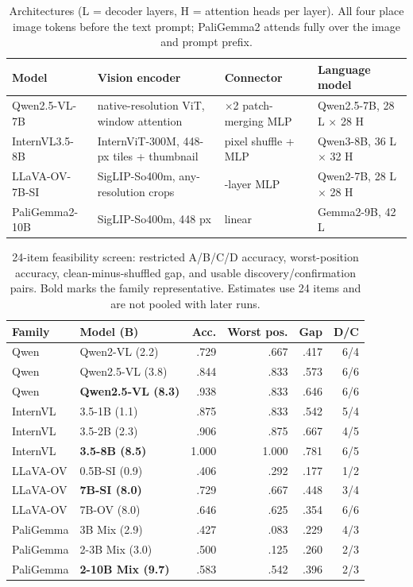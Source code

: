 \documentclass[11pt]{article}
\begin{document}
\begin{table}[h]
\centering
\scriptsize
\setlength{\tabcolsep}{2pt}
\begin{tabularx}{\columnwidth}{@{}l>{\raggedright\arraybackslash}X>{\raggedright\arraybackslash}X>{\raggedright\arraybackslash}p{}@{}}
\toprule
Model & Vision encoder & Connector & Language model \\
\midrule
Qwen2.5-VL-7B & native-resolution ViT, window attention & 2$\times$2 patch-merging MLP & Qwen2.5-7B, 28 L $\times$ 28 H \\
InternVL3.5-8B & InternViT-300M, 448-px tiles + thumbnail & pixel shuffle + MLP & Qwen3-8B, 36 L $\times$ 32 H \\
LLaVA-OV-7B-SI & SigLIP-So400m, any-resolution crops & 2-layer MLP & Qwen2-7B, 28 L $\times$ 28 H \\
PaliGemma2-10B & SigLIP-So400m, 448 px & linear & Gemma2-9B, 42 L \\
\bottomrule
\end{tabularx}
\caption{Architectures (L = decoder layers, H = attention heads per layer). All four place image tokens before the text prompt; PaliGemma2 attends fully over the image and prompt prefix.}
\label{tab:arch}
\end{table}

\begin{table}[h]
\centering
\scriptsize
\setlength{\tabcolsep}{2.5pt}
\begin{tabular}{@{}llrrrr@{}}
\toprule
Family & Model (B) & Acc. & Worst pos. & Gap & D/C \\
\midrule
Qwen & Qwen2-VL (2.2) & .729 & .667 & .417 & 6/4 \\
Qwen & Qwen2.5-VL (3.8) & .844 & .833 & .573 & 6/6 \\
Qwen & \textbf{Qwen2.5-VL (8.3)} & .938 & .833 & .646 & 6/6 \\
InternVL & 3.5-1B (1.1) & .875 & .833 & .542 & 5/4 \\
InternVL & 3.5-2B (2.3) & .906 & .875 & .667 & 4/5 \\
InternVL & \textbf{3.5-8B (8.5)} & 1.000 & 1.000 & .781 & 6/5 \\
LLaVA-OV & 0.5B-SI (0.9) & .406 & .292 & .177 & 1/2 \\
LLaVA-OV & \textbf{7B-SI (8.0)} & .729 & .667 & .448 & 3/4 \\
LLaVA-OV & 7B-OV (8.0) & .646 & .625 & .354 & 6/6 \\
PaliGemma & 3B Mix (2.9) & .427 & .083 & .229 & 4/3 \\
PaliGemma & 2-3B Mix (3.0) & .500 & .125 & .260 & 2/3 \\
PaliGemma & \textbf{2-10B Mix (9.7)} & .583 & .542 & .396 & 2/3 \\
\bottomrule
\end{tabular}
\caption{24-item feasibility screen: restricted A/B/C/D accuracy, worst-position accuracy, clean-minus-shuffled gap, and usable discovery/confirmation pairs. Bold marks the family representative. Estimates use 24 items and are not pooled with later runs.}
\end{table}
\end{document}
